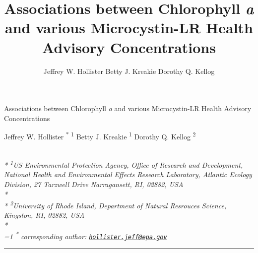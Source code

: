 \documentclass[11pt,]{article}
\title{Associations between Chlorophyll \emph{a} and various Microcystin-LR
Health Advisory Concentrations}
\author{
Jeffrey W. Hollister
Betty J. Kreakie
Dorothy Q. Kellog
}
\date{}
\begin{document}
\begin{singlespace}
\begin{center}
\huge Associations between Chlorophyll \emph{a} and various Microcystin-LR
Health Advisory Concentrations
\end{center}
\begin{center}
\large
Jeffrey W. Hollister \textsuperscript{*} \textsuperscript{1} 
Betty J. Kreakie \textsuperscript{1} 
Dorothy Q. Kellog \textsuperscript{2} 
\end{center}
\begin{justify}
\footnotesize \emph{ 
\\*
\textsuperscript{1}US Environmental Protection Agency, Office of Research and Development,
National Health and Environmental Effects Research Laboratory, Atlantic
Ecology Division, 27 Tarzwell Drive Narragansett, RI, 02882, USA\\*
\\*
\textsuperscript{2}University of Rhode Island, Department of Natural Resrouces Science,
Kingston, RI, 02882, USA\\*
}
\setcounter{num}{1}
\\[0.1cm]
\footnotesize \emph{ 
\ifnum\value{num}=1%
\textsuperscript{*} corresponding author:
\fi
\href{mailto:hollister.jeff@epa.gov}{\nolinkurl{hollister.jeff@epa.gov}}
}
\end{justify}
\normalsize

\end{singlespace}


\singlespace

\vspace{2mm}

\hrule
\end{document}
